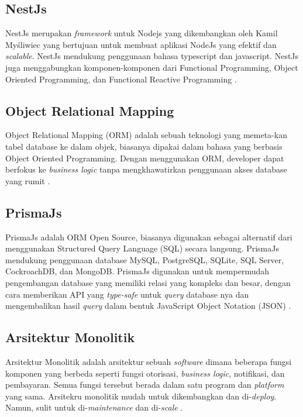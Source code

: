 \subsection{NestJs}
NestJs merupakan \textit{framework} untuk Nodejs yang dikembangkan oleh Kamil Myśliwiec yang bertujuan untuk membuat aplikasi NodeJs yang efektif dan \textit{scalable}. NestJs mendukung penggunaan bahasa typescript dan javascript. NestJs juga menggabungkan komponen-komponen dari Functional Programming, Object Oriented Programming, dan Functional Reactive Programming \cite{pham2020developing} \cite{NestJS}.

\subsection{Object Relational Mapping}
Object Relational Mapping (ORM) adalah sebuah teknologi yang memeta-kan tabel database ke dalam objek, biasanya dipakai dalam bahasa yang berbasis Object Oriented Programming. Dengan menggunakan ORM, developer dapat berfokus ke \textit{business logic} tanpa mengkhawatirkan penggunaan akses database yang rumit \cite{lorenz2017object}. 

\subsection{PrismaJs}
PrismaJs adalah ORM Open Source, biasanya digunakan sebagai alternatif dari menggunakan Structured Query Language (SQL) secara langsung. PrismaJs mendukung penggunaan database MySQL, PostgreSQL, SQLite, SQL Server, CockroachDB, dan MongoDB. PrismaJs digunakan untuk mempermudah pengembangan database yang memiliki relasi yang kompleks dan besar, dengan cara memberikan API yang \textit{type-safe} untuk \textit{query} database nya dan mengembalikan hasil \textit{query} dalam bentuk JavaScript Object Notation (JSON) \cite{Prisma}.

\subsection{Arsitektur Monolitik}
Arsitektur Monolitik adalah arsitektur sebuah \textit{software} dimana beberapa fungsi komponen yang berbeda seperti fungsi otorisasi, \textit{business logic}, notifikasi, dan pembayaran. Semua fungsi tersebut berada dalam satu program dan \textit{platform} yang sama. Arsitekru monolitik mudah untuk dikembangkan dan di-\textit{deploy}. Namun, sulit untuk di-\textit{maintenance} dan di-\textit{scale} \cite{gos2020comparison}. 


